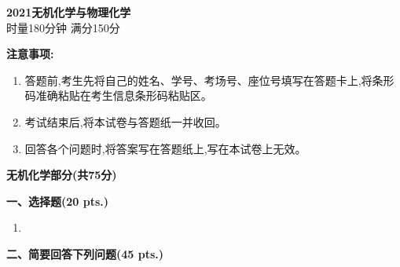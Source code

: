 \begin{center}
    {\LARGE \textbf{2021无机化学与物理化学}} \\[2ex]
    {\large 时量180分钟 \quad 满分150分}
\end{center}

\vspace{0.5cm}
\noindent\textbf{注意事项:}
\begin{enumerate}[label=\arabic*., parsep=0pt, itemsep=0pt]
    \item 答题前,考生先将自己的姓名、学号、考场号、座位号填写在答题卡上,将条形码准确粘贴在考生信息条形码粘贴区。
    \item 考试结束后,将本试卷与答题纸一并收回。
    \item 回答各个问题时,将答案写在答题纸上,写在本试卷上无效。
\end{enumerate}

\vspace{1cm}
\begin{center}
    {\Large \textbf{无机化学部分(共75分)}}
\end{center}

\noindent\textbf{一、选择题(20 pts.)}

\begin{enumerate}[label=\arabic*., itemsep=1.5ex]
    \item 

\end{enumerate}

\vspace{1em}
\noindent\textbf{二、简要回答下列问题(45 pts.)}

